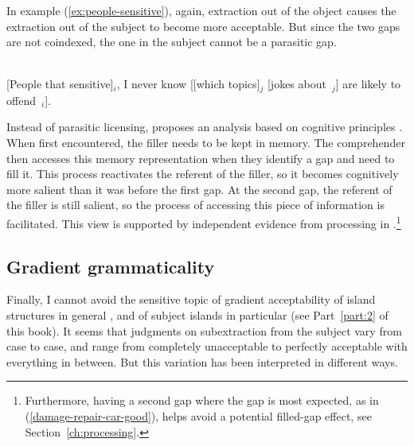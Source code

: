 In example (\ref{ex:people-sensitive}), again, extraction out of the object causes the extraction out of the subject to become more acceptable. But since the two gaps are not coindexed, the one in the subject cannot be a parasitic gap.


\ea \citep[305]{Chaves.2013}\\
{} [People that sensitive]$_i$, I never know [[which topics]$_j$ [jokes about~\trace{}$_j$] are likely to offend~\trace{}$_i$].
\label{ex:people-sensitive}
\z 

Instead of parasitic licensing, \citeauthor{Chaves.2013} proposes an analysis based on cognitive principles \citep{Chaves.2013,Chaves.2014,Chaves.2019.Frequency}. When first encountered, the filler needs to be kept in memory. The comprehender then accesses this memory representation when they identify a gap and need to fill it. 
This process reactivates the referent of the filler, so it becomes cognitively more salient than it was before the first gap. 
At the second gap, the referent of the filler is still salient, so the process of accessing this piece of information is facilitated. This view is supported by independent evidence from processing in \citet{Vasishth.2006}.\footnote{Furthermore, having a second gap where the gap is most expected, as in (\ref{damage-repair-car-good}), helps avoid a potential filled-gap effect, see Section~\ref{ch:processing}.} 

\subsection{Gradient grammaticality}

Finally, I cannot avoid the sensitive topic of gradient acceptability of island structures in general \citep{Hofmeister.2010,Hofmeister.2013}, and of subject islands in particular (see Part~\ref{part:2} of this book). It seems that judgments on subextraction from the subject vary from case to case, and range from completely unacceptable to perfectly acceptable with everything in between. But this variation has been interpreted in different ways.

